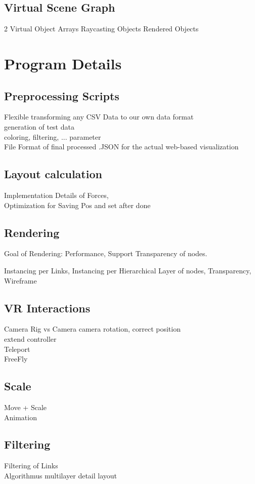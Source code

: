 \subsection{Virtual Scene Graph}
2 Virtual Object Arrays
Raycasting Objects
Rendered Objects

\section{Program Details}

\subsection{Preprocessing Scripts}

Flexible transforming any CSV Data to our own data format \\
generation of test data \\
coloring, filtering, ... parameter \\
File Format of final processed .JSON for the actual web-based visualization \\

\subsection{Layout calculation}
Implementation Details of Forces, \\
Optimization for Saving Pos and set after done

\subsection{Rendering}
Goal of Rendering: 
Performance, Support Transparency of nodes. 

Instancing per Links, 
Instancing per Hierarchical Layer of nodes, 
Transparency,
Wireframe

\subsection{VR Interactions}
Camera Rig vs Camera
camera rotation, correct position 
\\
extend controller
\\
Teleport
\\
FreeFly

\subsection{Scale}
Move + Scale\\
Animation
\\

\subsection{Filtering}
Filtering of Links\\
Algorithmus multilayer detail layout\\
